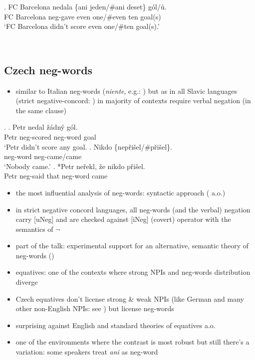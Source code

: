\documentclass[
  letterpaper,
  DIV=11,
  numbers=noendperiod]{scrartcl}
\providecommand{\tightlist}{%
  \setlength{\itemsep}{0pt}\setlength{\parskip}{0pt}}\usepackage{longtable,booktabs,array}
\begin{document}
\exg. FC Barcelona nedala \{ani jeden/\#ani deset\} gól/ů.\\
FC Barcelona neg-gave even one/\#even ten goal(s)\\
`FC Barcelona didn't score even one/\#ten goal(s).'

~

\hypertarget{czech-neg-words}{%
\subsection{Czech neg-words}\label{czech-neg-words}}

\begin{itemize}
\tightlist
\item
  similar to Italian neg-words (\emph{niente}, e.g.:
  \cite{ladusaw1992expressing}) but as in all Slavic languages (strict
  negative-concord: \cite{zeijlstra2004sentential}) in majority of
  contexts require verbal negation (in the same clause)
\end{itemize}

\ex. \ag. Petr nedal žádný gól.\\
Petr neg-scored neg-word goal\\
`Petr didn't score any goal.\textquotesingle{} \bg. Nikdo
\{nepřišel/\#přišel\}.\\
neg-word neg-came/came\\
`Nobody came.' \cg. *Petr neřekl, že nikdo přišel.\\
Petr neg-said that neg-word came\\
\hspace*{0.333em}

\begin{itemize}
\tightlist
\item
  the most influential analysis of neg-words: syntactic approach
  (\cite{zeijlstra2004sentential} a.o.)
\item
  in strict negative concord languages, all neg-words (and the verbal)
  negation carry {[}uNeg{]} and are checked against {[}iNeg{]} (covert)
  operator with the semantics of \(\neg\)
\item
  part of the talk: experimental support for an alternative, semantic
  theory of neg-words (\cite{ovalle2004double,kuhn2022dynamics})
\item
  equatives: one of the contexts where strong NPIs and neg-words
  distribution diverge
\item
  Czech equatives don't license strong \& weak NPIs (like German and
  many other non-English NPIs: see \cite{krifka1992some}) but license
  neg-words
\item
  surprising against English and standard theories of equatives
  \cite{stechow1984comparing,beck201913} a.o.
\item
  one of the environments where the contrast is most robust but still
  there's a variation: some speakers treat \emph{ani} as neg-word
\end{itemize}
\end{document}
